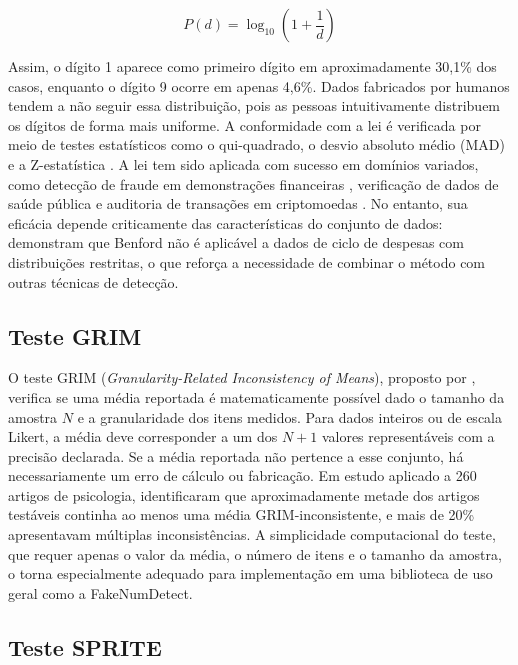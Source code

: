 \documentclass[
    12pt,                %
    openright,           %
    oneside,             %
    a4paper,             %
    english,             %
    brazil               %
]{abntex2}
\begin{document}
\begin{equation}
    P(d) = \log_{10}\!\left(1 + \frac{1}{d}\right)
\end{equation}

Assim, o dígito 1 aparece como primeiro dígito em aproximadamente 30,1\% dos casos, enquanto o dígito 9 ocorre em apenas 4,6\%. Dados fabricados por humanos tendem a não seguir essa distribuição, pois as pessoas intuitivamente distribuem os dígitos de forma mais uniforme. A conformidade com a lei é verificada por meio de testes estatísticos como o qui-quadrado, o desvio absoluto médio (MAD) e a Z-estatística \cite{Nigrini2012}.
A lei tem sido aplicada com sucesso em domínios variados, como detecção de fraude em demonstrações financeiras \cite{SameeRad2021}, verificação de dados de saúde pública \cite{Balashov2021} e auditoria de transações em criptomoedas \cite{Vicic2022}. No entanto, sua eficácia depende criticamente das características do conjunto de dados:  demonstram que Benford não é aplicável a dados de ciclo de despesas com distribuições restritas, o que reforça a necessidade de combinar o método com outras técnicas de detecção.

\subsection{Teste GRIM}

O teste GRIM (\textit{Granularity-Related Inconsistency of Means}), proposto por , verifica se uma média reportada é matematicamente possível dado o tamanho da amostra \(N\) e a granularidade dos itens medidos. Para dados inteiros ou de escala Likert, a média deve corresponder a um dos \(N + 1\) valores representáveis com a precisão declarada. Se a média reportada não pertence a esse conjunto, há necessariamente um erro de cálculo ou fabricação.
Em estudo aplicado a 260 artigos de psicologia,  identificaram que aproximadamente metade dos artigos testáveis continha ao menos uma média GRIM-inconsistente, e mais de 20\% apresentavam múltiplas inconsistências. A simplicidade computacional do teste, que requer apenas o valor da média, o número de itens e o tamanho da amostra, o torna especialmente adequado para implementação em uma biblioteca de uso geral como a FakeNumDetect.

\subsection{Teste SPRITE}
\end{document}
